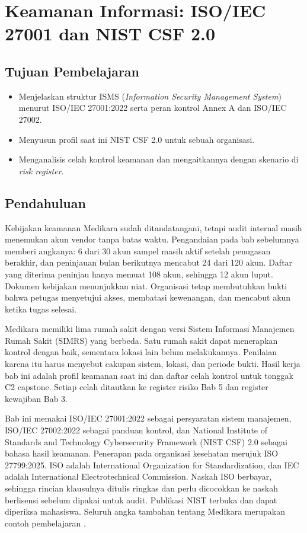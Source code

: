 \chapter{Keamanan Informasi: ISO/IEC 27001 dan NIST CSF 2.0}

\section*{Tujuan Pembelajaran}
\begin{itemize}
  \item Menjelaskan struktur ISMS (\textit{Information Security Management System}) menurut
  ISO/IEC 27001:2022 serta peran kontrol Annex A dan ISO/IEC 27002.
  \item Menyusun profil saat ini NIST CSF 2.0 untuk sebuah organisasi.
  \item Menganalisis celah kontrol keamanan dan mengaitkannya dengan skenario di \textit{risk
  register}.
\end{itemize}

\section{Pendahuluan}

Kebijakan keamanan Medikara sudah ditandatangani, tetapi audit internal masih menemukan akun
vendor tanpa batas waktu. Pengandaian pada bab sebelumnya memberi angkanya: 6 dari 30 akun sampel
masih aktif setelah penugasan berakhir, dan peninjauan bulan berikutnya mencabut 24 dari 120 akun.
Daftar yang diterima peninjau hanya memuat 108 akun, sehingga 12 akun luput. Dokumen kebijakan
menunjukkan niat. Organisasi tetap membutuhkan bukti bahwa petugas menyetujui akses, membatasi
kewenangan, dan mencabut akun ketika tugas selesai.

Medikara memiliki lima rumah sakit dengan versi Sistem Informasi Manajemen Rumah Sakit (SIMRS)
yang berbeda. Satu rumah sakit dapat menerapkan kontrol dengan baik, sementara lokasi lain belum
melakukannya. Penilaian karena itu harus menyebut cakupan sistem, lokasi, dan periode bukti. Hasil
kerja bab ini adalah profil keamanan saat ini dan daftar celah kontrol untuk tonggak C2 capstone.
Setiap celah ditautkan ke register risiko Bab 5 dan register kewajiban Bab 3.

Bab ini memakai ISO/IEC 27001:2022 sebagai persyaratan sistem manajemen, ISO/IEC 27002:2022
sebagai panduan kontrol, dan National Institute of Standards and Technology Cybersecurity
Framework (NIST CSF) 2.0 sebagai bahasa hasil keamanan. Penerapan pada organisasi kesehatan merujuk
ISO 27799:2025. ISO adalah International Organization for Standardization, dan IEC adalah
International Electrotechnical Commission. Naskah ISO berbayar, sehingga rincian klausulnya ditulis
ringkas dan perlu dicocokkan ke naskah berlisensi sebelum dipakai untuk audit. Publikasi NIST
terbuka dan dapat diperiksa mahasiswa. Seluruh angka tambahan tentang Medikara merupakan contoh
pembelajaran \cite{iso27001-2022,iso27002-2022,iso27799-2025,nistcsf2}.

